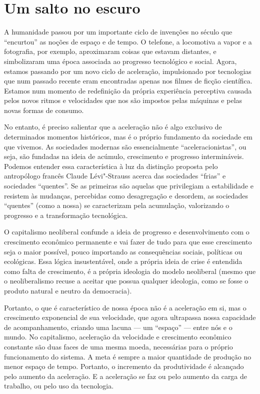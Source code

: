 \chapter{Um salto no escuro}

A humanidade passou por um importante ciclo de invenções no século 
que ``encurtou'' as noções de espaço e de tempo. O telefone, a
locomotiva a vapor e a fotografia, por exemplo, aproximaram coisas que
estavam distantes, e simbolizaram uma época associada ao progresso
tecnológico e social. Agora, estamos passando por um novo ciclo de
aceleração, impulsionado por tecnologias que num passado recente eram
encontradas apenas nos filmes de ficção científica. Estamos num momento
de redefinição da própria experiência perceptiva causada pelos novos
ritmos e velocidades que nos são impostos pelas máquinas e pelas novas
formas de consumo.

No entanto, é preciso salientar que a aceleração não é algo exclusivo de
determinados momentos históricos, mas é o próprio fundamento da
sociedade em que vivemos. As sociedades modernas são essencialmente
``aceleracionistas'', ou seja, são fundadas na ideia de acúmulo,
crescimento e progresso intermináveis. Podemos entender essa
característica à luz da distinção proposta pelo antropólogo francês
Claude Lévi"-Strauss acerca das sociedades ``frias'' e sociedades
``quentes''. Se as primeiras são aquelas que privilegiam a estabilidade
e resistem às mudanças, percebidas como desagregação e desordem, as
sociedades ``quentes'' (como a nossa) se caracterizam pela acumulação,
valorizando o progresso e a transformação tecnológica.

O capitalismo neoliberal confunde a ideia de progresso e desenvolvimento
com o crescimento econômico permanente e vai fazer de tudo para que esse
crescimento seja o maior possível, pouco importando as consequências
sociais, políticas ou ecológicas. Essa lógica insustentável, onde a
própria ideia de crise é entendida como falta de crescimento, é a
própria ideologia do modelo neoliberal (mesmo que o neoliberalismo
recuse a aceitar que possua qualquer ideologia, como se fosse o produto
natural e neutro da democracia).

Portanto, o que é característico de nossa época não é a aceleração em
si, mas o crescimento exponencial de sua velocidade, que agora
ultrapassa nossa capacidade de acompanhamento, criando uma lacuna --- um
``espaço'' --- entre nós e o mundo. No capitalismo, aceleração da
velocidade e crescimento econômico constante são duas faces de uma mesma
moeda, necessárias para o próprio funcionamento do sistema. A meta é
sempre a maior quantidade de produção no menor espaço de tempo.
Portanto, o incremento da produtividade é alcançado pelo aumento da
aceleração. E a aceleração se faz ou pelo aumento da carga de trabalho,
ou pelo uso da tecnologia.

